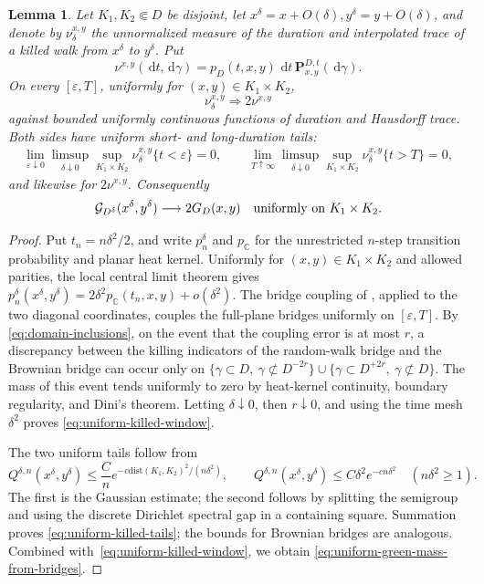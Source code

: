 \documentclass[11pt]{article}
\numberwithin{equation}{section}
\newcommand{\C}{\mathbb{C}}
\newcommand{\1}{\mathbf{1}}
\newcommand{\dist}{\mathrm{dist}}
\newtheorem{lemma}[theorem]{Lemma}
\newcommand{\dd}{\,\mathrm d}
\newcommand{\Gc}{\mathcal G}
\begin{document}
\begin{lemma}
\label{lem:uniform-killed-bridge}
Let \(K_1,K_2\Subset D\) be disjoint, let
\(x^\delta=x+O(\delta),y^\delta=y+O(\delta)\), and denote by
\(\nu_\delta^{x,y}\) the unnormalized measure of the duration and
interpolated trace of a killed walk from \(x^\delta\) to \(y^\delta\).  Put
\[
 \nu^{x,y}(\dd t,\dd\gamma)
 =p_D(t,x,y)\,\dd t\,\mathbf P_{x,y}^{D,t}(\dd\gamma).
\]
On every \([\varepsilon,T]\), uniformly for
\((x,y)\in K_1\times K_2\),
\begin{equation}\label{eq:uniform-killed-window}
 \nu_\delta^{x,y}\Longrightarrow2\nu^{x,y}
\end{equation}
against bounded uniformly continuous functions of duration and Hausdorff
trace.  Both sides have uniform short- and long-duration tails:
\begin{align}\label{eq:uniform-killed-tails}
 \lim_{\varepsilon\downarrow0}\limsup_{\delta\downarrow0}
 \sup_{K_1\times K_2}\nu_\delta^{x,y}\{t<\varepsilon\}=0, \qquad \lim_{T\uparrow\infty}\limsup_{\delta\downarrow0}
 \sup_{K_1\times K_2}\nu_\delta^{x,y}\{t>T\}=0,
\end{align}
and likewise for \(2\nu^{x,y}\).  Consequently
\begin{equation}\label{eq:uniform-green-mass-from-bridges}
 \Gc_{D^\delta}(x^\delta,y^\delta)\longrightarrow2G_D(x,y)
 \quad\hbox{uniformly on }K_1\times K_2.
\end{equation}
\end{lemma}
\begin{proof}
Put \(t_n=n\delta^2/2\), and write \(p_n^\delta\) and \(p_\C\) for the
unrestricted \(n\)-step transition probability and planar heat kernel.  Uniformly for \((x,y)\in K_1\times K_2\) and allowed parities, the local central limit theorem
\cite[Theorem~2.1.3]{LawlerLimic2010} gives
\(p_n^\delta(x^\delta,y^\delta)=2\delta^2p_\C(t_n,x,y)+o(\delta^2)\).
The bridge coupling of
 \cite[Theorem~6.4]{LawlerTrujillo2007}, applied to the two diagonal
 coordinates, couples the full-plane bridges uniformly on
 \([\varepsilon,T]\).  By
 \eqref{eq:domain-inclusions}, on the event that the coupling error is at most $r$, a discrepancy between the killing indicators of the random-walk bridge and the Brownian bridge can occur only on $\{\gamma\subset D,\ \gamma\not\subset D^{-2r}\}\cup\{\gamma\subset D^{+2r},\ \gamma\not\subset D\}$.  The mass of this event tends uniformly to zero by heat-kernel continuity, boundary regularity, and Dini's theorem.  Letting \(\delta\downarrow0\), then \(r\downarrow0\), and
using the time mesh \(\delta^2\) proves \eqref{eq:uniform-killed-window}.

The two uniform tails follow from
\[
 Q^{\delta,n}(x^\delta,y^\delta)
 \leq \frac Cn e^{-c\dist(K_1,K_2)^2/(n\delta^2)},
 \qquad
 Q^{\delta,n}(x^\delta,y^\delta)
 \leq C\delta^2e^{-cn\delta^2}\quad(n\delta^2\geq1).
\]
The first is the Gaussian estimate; the second follows by splitting the
semigroup and using the discrete Dirichlet spectral gap in a containing square.  Summation proves
\eqref{eq:uniform-killed-tails};
the bounds for Brownian bridges are analogous.  Combined with~\eqref{eq:uniform-killed-window}, we obtain \eqref{eq:uniform-green-mass-from-bridges}.
\end{proof}
\end{document}

